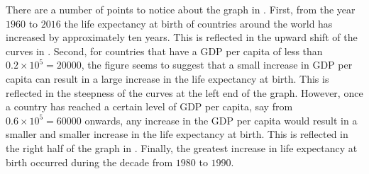 \documentclass[a4paper,oneside,12pt]{article}
\begin{document}
\begin{problem}
{\begin{solution}
There are a number of points to notice about the graph in
.  First, from the year
$1960$ to $2016$ the life expectancy at birth of countries around the
world has increased by approximately ten years.  This is reflected in
the upward shift of the curves in
.  Second, for countries
that have a GDP per capita of less than $0.2 \times 10^5 = 20000$, the
figure seems to suggest that a small increase in GDP per capita can
result in a large increase in the life expectancy at birth.  This is
reflected in the steepness of the curves at the left end of the
graph.  However, once a country has reached a certain level of GDP per
capita, say from $0.6 \times 10^5 = 60000$ onwards, any increase in
the GDP per capita would result in a smaller and smaller increase in
the life expectancy at birth.  This is reflected in the right half of
the graph in .  Finally,
the greatest increase in life expectancy at birth occurred during the
decade from $1980$ to $1990$.
\end{solution}
}{}


\end{problem}
\end{document}

